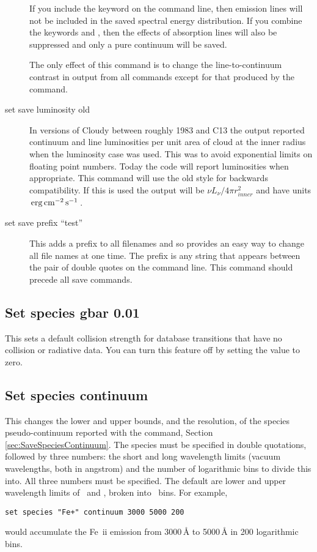 \begin{description}
If you include the keyword  on the command line, then
emission lines will not be included in the saved spectral energy distribution.
If you combine the keywords  and , then
the effects of absorption lines will also be suppressed and only a pure continuum
will be saved.

The only effect of this command is to change the line-to-continuum
contrast in output from all  commands
except for that produced by the
 command.

\item[set save luminosity old]  
\label{sec:SetSaveLuminosity}
In versions of Cloudy between
roughly 1983 and C13 the  output
reported continuum and line luminosities per unit area of
cloud at the inner radius when the luminosity case was used.
This was to avoid exponential limits on floating point numbers.
Today the code will report luminosities when appropriate.
This command will use the old style for backwards compatibility.
If this is used the  output will be
$\nu L_{\nu} / 4 \pi r_{inner}^2$ and have units $\mbox{${\rm\thinspace erg}{\rm\thinspace cm}^{-2}{\rm\thinspace s}^{-1}\,$}$.

\item[set save prefix ``test'']  This adds a prefix
to all filenames and so
provides an easy way to change all file names at one time.
\label{sec:CommandSetSavePrefix}
The prefix is any string that appears between the pair of
double quotes on the command line. This command should precede
all save commands.

\end{description}

\subsection{Set species gbar 0.01}
This sets a default collision strength for database transitions that have 
no collision or radiative data.
You can turn this feature off by setting the value to zero.

\subsection{Set species continuum}
\label{sec:SetSpeciesContinuum}

\par
This changes the lower and upper bounds, and the resolution,
of the species pseudo-continuum reported with the
 command,
Section \ref{sec:SaveSpeciesContinuum}.
The species must be specified in double quotations, followed
by three numbers: the short and long wavelength limits
(vacuum wavelengths, both in angstrom) and the number of logarithmic bins to
divide this into.
All three numbers must be specified.
The default are lower and upper wavelength limits of
\speciesConWlLo\ and \speciesConWlHi,
broken into \speciesConNbins\ bins.
For example,
%
\begin{verbatim}
set species "Fe+" continuum 3000 5000 200
\end{verbatim}
%
would accumulate the Fe~{\sc ii} emission from 3000\,\AA{}
to 5000\,\AA{} in 200 logarithmic bins.


